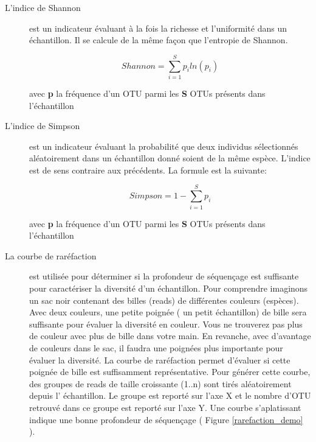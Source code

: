 \documentclass[12pt,a4paper]{article}
\begin{document}
\begin{description}
\item[L'indice de Shannon] est un indicateur évaluant à la fois la richesse et l’uniformité dans un échantillon. Il se calcule de la même façon que l’entropie de Shannon.

\begin{mycapequ}[!h]
   \begin{equation}
     Shannon = \sum_{i=1}^Sp_{i}ln(p_{i})
   \end{equation}
      \caption{avec \textbf{p} la fréquence d'un OTU parmi les \textbf{S} OTUs présents dans l'échantillon}
\end{mycapequ}

\item[L'indice de Simpson] est un indicateur évaluant la probabilité que deux individus sélectionnés aléatoirement dans un échantillon donné soient de la même espèce. L'indice est de sens contraire aux précédents. La formule est la suivante:

\begin{mycapequ}[!h]
   \begin{equation}
     Simpson = 1 - \sum_{i=1}^Sp_{i}
   \end{equation}
      \caption{avec \textbf{p} la fréquence d'un OTU parmi les \textbf{S} OTUs présents dans l'échantillon}
\end{mycapequ}

\newpage

\item[La courbe de raréfaction] est utilisée pour déterminer si la profondeur de séquençage est suffisante pour caractériser la diversité d’un échantillon. Pour comprendre imaginons un sac noir contenant des billes (reads) de différentes couleurs (espèces). Avec deux couleurs, une petite poignée ( un petit échantillon) de bille sera suffisante pour évaluer la diversité en couleur. Vous ne trouverez pas plus de couleur avec plus de bille dans votre main. En revanche, avec d'avantage de couleurs dans le sac, il faudra une poignées plus importante pour évaluer la diversité. La courbe de raréfaction permet d'évaluer si cette poignée de bille est suffisamment représentative.
Pour générer cette courbe, des groupes de reads de taille croissante (1..n) sont tirés aléatoirement depuis l' échantillon. Le groupe est reporté sur l'axe X et le nombre d'OTU retrouvé dans ce groupe est reporté sur l’axe Y.
Une courbe s’aplatissant indique une bonne profondeur de séquençage ( Figure \ref{rarefaction_demo} ).
\end{description}
\end{document}
